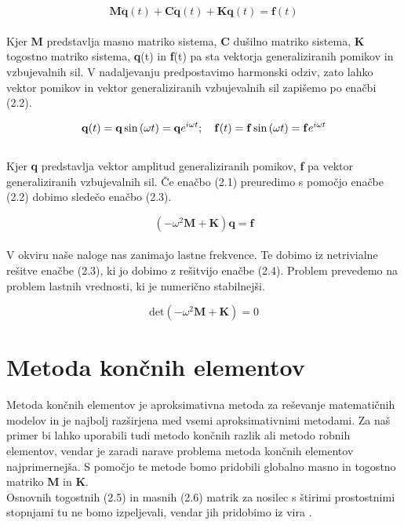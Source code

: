 \documentclass[12pt]{report}
\begin{document}
\begin{equation}
  \mathbf{M} \mathbf{\ddot{q}}(t) + \mathbf{C} \mathbf{\dot{q}}(t) + \mathbf{K} \mathbf{q}(t) = \mathbf{f}(t)
\end{equation}
\\
Kjer \textbf{M} predstavlja masno matriko sistema, \textbf{C} dušilno matriko sistema, \textbf{K} togostno matriko sistema, \textbf{q}(t) in \textbf{f}(t)
pa sta vektorja generaliziranih pomikov in vzbujevalnih sil.
V nadaljevanju predpostavimo harmonski odziv, zato lahko vektor pomikov in vektor generaliziranih vzbujevalnih sil zapišemo po enačbi (2.2).

\begin{equation}
  \mathbf{q}(t)=\mathbf{q} \sin{(\omega t)} =\mathbf{q}e^{i\omega t}; \\ \quad
  \mathbf{f}(t)=\mathbf{f} \sin{(\omega t)} =\mathbf{f}e^{i\omega t}
\end{equation}
\\
Kjer \textbf{q} predstavlja vektor amplitud generaliziranih pomikov, \textbf{f} pa vektor generaliziranih vzbujevalnih sil. Če enačbo (2.1) preuredimo s pomočjo enačbe (2.2) dobimo sledečo enačbo
(2.3).

\begin{equation}
  (-\omega^2 \mathbf{M} + \mathbf{K}) \mathbf{q} = \mathbf{f}
\end{equation}
\\
V okviru naše naloge nas zanimajo lastne frekvence. Te dobimo iz netrivialne rešitve enačbe (2.3), ki jo dobimo z rešitvijo enačbe (2.4).
Problem prevedemo na problem lastnih vrednosti, ki je numerično stabilnejši.

\begin{equation}
  \textrm{det} (-\omega^2 \mathbf{M} + \mathbf{K})=0  
\end{equation}

\section{Metoda končnih elementov}
Metoda končnih elementov je aproksimativna metoda za reševanje matematičnih modelov in je najbolj razširjena med vsemi aproksimativnimi metodami.
Za naš primer bi lahko uporabili tudi metodo končnih razlik ali metodo robnih elementov, vendar je zaradi narave problema metoda končnih elementov najprimernejša.
S pomočjo te metode bomo pridobili globalno masno in togostno matriko \textbf{M} in \textbf{K}. 
\\
Osnovnih togostnih (2.5) in masnih (2.6) matrik za nosilec s štirimi prostostnimi stopnjami tu ne bomo izpeljevali, vendar jih pridobimo iz vira \cite{ville}.
\end{document}
